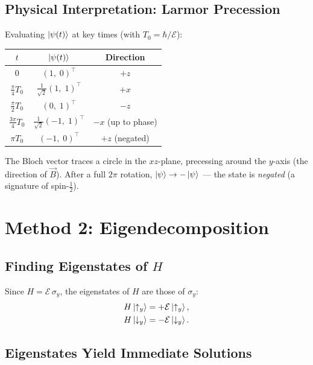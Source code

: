 \documentclass[11pt,a4paper]{article}
\theoremstyle{definition}
\theoremstyle{plain}
\theoremstyle{remark}
\begin{document}
\subsection{Physical Interpretation: Larmor Precession}

Evaluating $\ket{\psi(t)}$ at key times (with $T_0 = \hbar/\mathcal{E}$):

\begin{center}
\renewcommand{\arraystretch}{1.5}
\begin{tabular}{c|c|c}
    $t$ & $\ket{\psi(t)}$ & Direction \\ \hline
    $0$ & $(1,\; 0)^\top$ & $+z$ \\
    $\frac{\pi}{4}T_0$ & $\frac{1}{\sqrt{2}}(1,\; 1)^\top$ & $+x$ \\
    $\frac{\pi}{2}T_0$ & $(0,\; 1)^\top$ & $-z$ \\
    $\frac{3\pi}{4}T_0$ & $\frac{1}{\sqrt{2}}(-1,\; 1)^\top$ & $-x$ (up to phase) \\
    $\pi T_0$ & $(-1,\; 0)^\top$ & $+z$ (negated)
\end{tabular}
\end{center}

The Bloch vector traces a circle in the $xz$-plane, precessing around the $y$-axis (the direction of $\vec{B}$). After a full $2\pi$ rotation, $\ket{\psi} \to -\ket{\psi}$ --- the state is \emph{negated} (a signature of spin-$\frac{1}{2}$).

\section{Method 2: Eigendecomposition}

\subsection{Finding Eigenstates of $H$}

Since $H = \mathcal{E}\,\sigma_y$, the eigenstates of $H$ are those of $\sigma_y$:
\begin{align}
    H\ket{\uparrow_y} &= +\mathcal{E}\ket{\uparrow_y}, \\
    H\ket{\downarrow_y} &= -\mathcal{E}\ket{\downarrow_y}.
\end{align}

\subsection{Eigenstates Yield Immediate Solutions}
\end{document}
